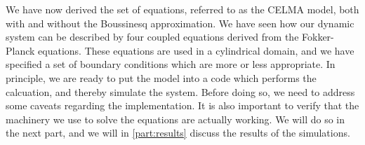 We have now derived the set of equations, referred to as the CELMA model, both with and without the Boussinesq approximation.
We have seen how our dynamic system can be described by four coupled equations derived from the Fokker-Planck equations.
These equations are used in a cylindrical domain, and we have specified a set of boundary conditions which are more or less appropriate.
In principle, we are ready to put the model into a code which performs the calcuation, and thereby simulate the system.
Before doing so, we need to address some caveats regarding the implementation.
It is also important to verify that the machinery we use to solve the equations are actually working.
We will do so in the next part, and we will in \cref{part:results} discuss the results of the simulations.
